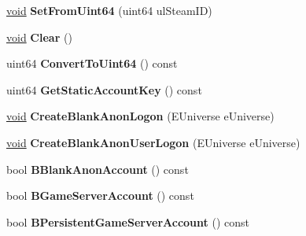 \begin{DoxyCompactItemize}
\item 
\hypertarget{classCSteamID_a072df3ce585dc3e5c7e43e8668c46c78}{}\hyperlink{SDL__audio_8h_a52835ae37c4bb905b903cbaf5d04b05f}{void} {\bfseries Set\+From\+Uint64} (uint64 ul\+Steam\+I\+D)\label{classCSteamID_a072df3ce585dc3e5c7e43e8668c46c78}

\item 
\hypertarget{classCSteamID_ab71588633495f381bcc780722c2cdbda}{}\hyperlink{SDL__audio_8h_a52835ae37c4bb905b903cbaf5d04b05f}{void} {\bfseries Clear} ()\label{classCSteamID_ab71588633495f381bcc780722c2cdbda}

\item 
\hypertarget{classCSteamID_ac98373e4d920369855594db1c3da396c}{}uint64 {\bfseries Convert\+To\+Uint64} () const \label{classCSteamID_ac98373e4d920369855594db1c3da396c}

\item 
\hypertarget{classCSteamID_aafd807a80e23fedfb8baa3d8f012b3a9}{}uint64 {\bfseries Get\+Static\+Account\+Key} () const \label{classCSteamID_aafd807a80e23fedfb8baa3d8f012b3a9}

\item 
\hypertarget{classCSteamID_a5a29e95bab1b880434b79248a9cafb76}{}\hyperlink{SDL__audio_8h_a52835ae37c4bb905b903cbaf5d04b05f}{void} {\bfseries Create\+Blank\+Anon\+Logon} (E\+Universe e\+Universe)\label{classCSteamID_a5a29e95bab1b880434b79248a9cafb76}

\item 
\hypertarget{classCSteamID_affb4c54f7b3c16815b1befbb7ef860c1}{}\hyperlink{SDL__audio_8h_a52835ae37c4bb905b903cbaf5d04b05f}{void} {\bfseries Create\+Blank\+Anon\+User\+Logon} (E\+Universe e\+Universe)\label{classCSteamID_affb4c54f7b3c16815b1befbb7ef860c1}

\item 
\hypertarget{classCSteamID_a0149469355e7224c1b2055aaa5f2ee68}{}bool {\bfseries B\+Blank\+Anon\+Account} () const \label{classCSteamID_a0149469355e7224c1b2055aaa5f2ee68}

\item 
\hypertarget{classCSteamID_a984a15fae8cdc17cc0f4c6ee8e3c9bf1}{}bool {\bfseries B\+Game\+Server\+Account} () const \label{classCSteamID_a984a15fae8cdc17cc0f4c6ee8e3c9bf1}

\item 
\hypertarget{classCSteamID_aa2dab9a8aa811a307eb201e2d20a06c5}{}bool {\bfseries B\+Persistent\+Game\+Server\+Account} () const \label{classCSteamID_aa2dab9a8aa811a307eb201e2d20a06c5}


\end{DoxyCompactItemize}
